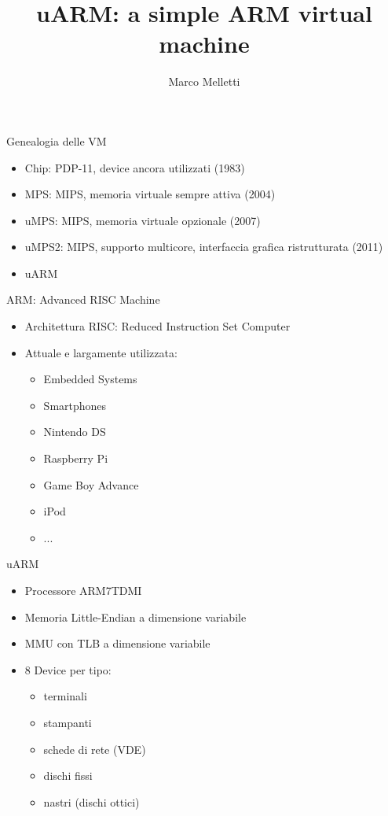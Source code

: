 \documentclass{beamer}
\author{Marco Melletti}
\title{uARM: a simple ARM virtual machine}
\begin{document}
\begin{frame}
        \titlepage
\end{frame}

\begin{frame}{Genealogia delle VM}
\begin{itemize}\itemsep20pt
\item Chip: PDP-11, device ancora utilizzati (1983)
\item MPS: MIPS, memoria virtuale sempre attiva (2004)
\item uMPS: MIPS, memoria virtuale opzionale (2007)
\item uMPS2: MIPS, supporto multicore, interfaccia grafica ristrutturata (2011)
\item uARM
\end{itemize}
\end{frame}

\begin{frame}{ARM: Advanced RISC Machine}
\begin{itemize}\itemsep20pt
\item Architettura RISC: Reduced Instruction Set Computer
\item Attuale e largamente utilizzata:

	\begin{itemize}\itemsep4pt
	\item Embedded Systems
	\item Smartphones
	\item Nintendo DS
	\item Raspberry Pi
	\item Game Boy Advance
	\item iPod
	\item ...
	\end{itemize}
\end{itemize}
\end{frame}

\begin{frame}{uARM}
\begin{itemize}\itemsep10pt
\item Processore ARM7TDMI
\item Memoria Little-Endian a dimensione variabile
\item MMU con TLB a dimensione variabile
\item 8 Device per tipo:

	\begin{itemize}\itemsep4pt
	\item terminali
	\item stampanti
	\item schede di rete (VDE)
	\item dischi fissi
	\item nastri (dischi ottici)
	\end{itemize}
\end{itemize}
\end{frame}
\end{document}
